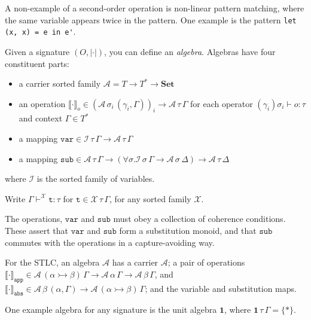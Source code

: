 \documentclass[11pt,a4paper]{article}
\newcommand*\ctxext[2]{{#1}, {#2}}
\newcommand*\ctxcons[2]{{#1}, {#2}}
\begin{document}
A non-example of a second-order operation is non-linear pattern matching, where
the same variable appears twice in the pattern. One example is the pattern
\verb|let (x, x) = e in e'|.

Given a signature \((O , {\vert\cdot\vert})\), you can define an \emph{algebra}. Algebras
have four constituent parts:

\begin{itemize}
\item a carrier sorted family \(\mathcal{A} = {T \to T^* \to \mathbf{Set}}\)
\item an operation \({\llbracket\cdot\rrbracket}_o \in
  {{(\mathcal{A}\,\sigma_i\,(\ctxext{\gamma_i}{\Gamma}))}_i \to {\mathcal{A}\,\tau\,\Gamma}}\) for each operator
  \({(\gamma_i)\sigma_i} \vdash o : \tau\) and context \(\Gamma \in {T^*}\)
\item a mapping \(\mathtt{var} \in {{\mathcal{I}\,\tau\,\Gamma} \to {\mathcal{A}\,\tau\,\Gamma}}\)
\item a mapping \(\mathtt{sub} \in {{\mathcal{A}\,\tau\,\Gamma} \to (\forall \sigma. {{\mathcal{I}\,\sigma\,\Gamma} \to {\mathcal{A}\,\sigma\,\Delta}}) \to
  {\mathcal{A}\,\tau\,\Delta}}\)
\end{itemize}

where \(\mathcal{I}\) is the sorted family of variables.

Write \(\Gamma \vdash^{\mathcal{X}} \mathtt{t} : \tau\) for \(\mathtt{t} \in {\mathcal{X}\,\tau\,\Gamma}\), for any sorted
family \(\mathcal{X}\).

The operations, \(\mathtt{var}\) and \(\mathtt{sub}\) must obey a collection of
coherence conditions. These assert that \(\mathtt{var}\) and \(\mathtt{sub}\)
form a substitution monoid, and that \(\mathtt{sub}\) commutes with the
operations in a capture-avoiding way\footnotemark{}.


For the STLC, an algebra \(\mathcal{A}\) has a carrier \(\mathcal{A}\); a pair of operations
\({\llbracket\cdot\rrbracket}_\mathtt{app} \in {{\mathcal{A}\,(\alpha\rightarrowtail\beta)\,\Gamma} \to {\mathcal{A}\,\alpha\,\Gamma} \to
  {\mathcal{A}\,\beta\,\Gamma}}\), and \({\llbracket\cdot\rrbracket}_\mathtt{abs} \in
  {{\mathcal{A}\,\beta\,(\ctxcons{\alpha}{\Gamma})} \to {\mathcal{A}\,(\alpha\rightarrowtail\beta)\,\Gamma}}\); and the variable and
  substitution maps.

One example algebra for any signature is the unit algebra \(\mathbf{1}\), where
\(\mathbf{1}\,\tau\,\Gamma = {\{\ast\}}\).
\end{document}
